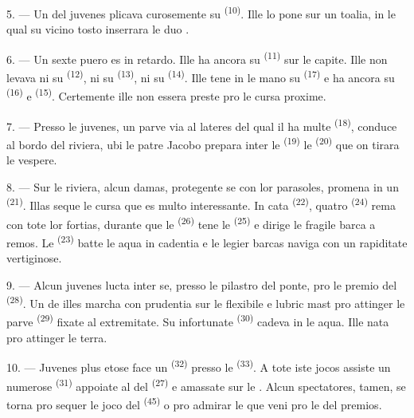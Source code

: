 5. --- Un del juvenes plicava curosemente su 
\textsuperscript{(10)}. Ille lo pone sur un toalia, in le qual su vicino tosto
inserrara le duo .

6. --- Un sexte puero es in retardo. Ille ha ancora su 
\textsuperscript{(11)} sur le capite. Ille non levava ni su 
\textsuperscript{(12)}, ni su  \textsuperscript{(13)}, ni su
 \textsuperscript{(14)}. Ille tene in le mano su
 \textsuperscript{(17)} e ha ancora su 
\textsuperscript{(16)} e  \textsuperscript{(15)}. Certemente
ille non essera preste pro le cursa proxime.

7. --- Presso le juvenes, un parve via al lateres del qual il ha multe
 \textsuperscript{(18)}, conduce al bordo del riviera, ubi le
patre Jacobo prepara inter le  \textsuperscript{(19)} le
 \textsuperscript{(20)} que on tirara le vespere.

\VUsaut{4.4mm}
\VUsaut{3.4mm}

8. --- Sur le riviera, alcun damas, protegente se con lor parasoles, promena in
un  \textsuperscript{(21)}. Illas seque le cursa que es multo
interessante. In cata  \textsuperscript{(22)}, quatro
 \textsuperscript{(24)} rema con tote lor fortias, durante que
le  \textsuperscript{(26)} tene le 
\textsuperscript{(25)} e dirige le fragile barca a remos. Le 
\textsuperscript{(23)} batte le aqua in cadentia e le legier barcas naviga con
un rapiditate vertiginose.

9. --- Alcun juvenes lucta inter se, presso le pilastro del ponte, pro le
premio del  \textsuperscript{(28)}. Un de illes marcha con
prudentia sur le flexibile e lubric mast pro attinger le parve 
\textsuperscript{(29)} fixate al extremitate. Su infortunate
 \textsuperscript{(30)} cadeva in le aqua. Ille nata pro
attinger le terra.

10. --- Juvenes plus etose face un 
\textsuperscript{(32)} presso le  \textsuperscript{(33)}. A tote
iste jocos assiste un numerose  \textsuperscript{(31)} appoiate
al  del  \textsuperscript{(27)} e amassate sur
le . Alcun spectatores, tamen, se torna pro sequer le joco del
 \textsuperscript{(45)} o pro admirar le  que veni pro le  del premios.

